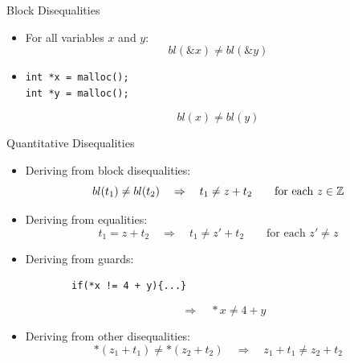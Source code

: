 \documentclass[aspectratio=169]{beamer}
\begin{document}
\begin{frame}{Block Disequalities}
    \begin{itemize}
        \item For all variables $x$ and $y$:
              \[
                  bl(\&x) \neq bl(\&y)
              \]
        \pause
        \item
              \begin{verbatim}
int *x = malloc();
int *y = malloc();
\end{verbatim}

              \[
                  bl(x) \neq bl(y)
              \]

    \end{itemize}
\end{frame}

\begin{frame}{Quantitative Disequalities}
    \begin{itemize}
        \item Deriving from block disequalities:
              \[
                  bl(t_1) \neq bl(t_2) \quad\Rightarrow\quad  t_1\neq z+ t_2 \quad\quad \text{for each $z \in \mathbb{Z}$}
              \]
              \pause
        \item Deriving from equalities:
              \[
                  t_1 = z + t_2  \quad\Rightarrow\quad t_1\neq z' + t_2 \quad\quad \text{for each $z' \neq z$}
              \]
              \pause
        \item Deriving from guards:

        \begin{minipage}{0.4\textwidth}
\begin{verbatim}
        if(*x != 4 + y){...}
\end{verbatim}
\end{minipage}
\begin{minipage}{0.45\textwidth}
\[
    \quad\Rightarrow\quad *x\neq 4 + y
\]
\end{minipage}

              \pause
        \item Deriving from other disequalities:
              \[ *(z_1 + t_1) \neq *(z_2 + t_2) \quad\Rightarrow\quad z_1 + t_1 \neq z_2 + t_2
              \]
    \end{itemize}
\end{frame}
\end{document}
